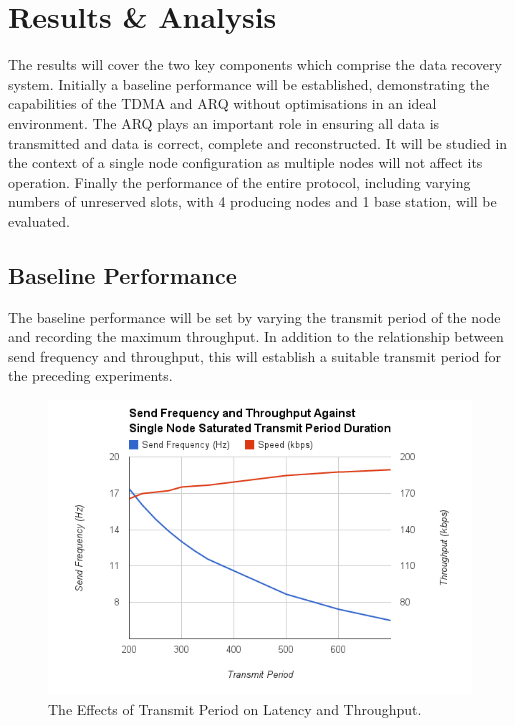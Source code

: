 \documentclass[parskip]{cs4rep}
\begin{document}
\section{Results \& Analysis}

The results will cover the two key components which comprise the data recovery system. Initially a baseline performance will be established, demonstrating the capabilities of the TDMA and ARQ without optimisations in an ideal environment. The ARQ plays an important role in ensuring all data is transmitted and data is correct, complete and reconstructed. It will be studied in the context of a single node configuration as multiple nodes will not affect its operation. Finally the performance of the entire protocol, including varying numbers of unreserved slots, with 4 producing nodes and 1 base station, will be evaluated.

\subsection{Baseline Performance}

The baseline performance will be set by varying the transmit period of the node and recording the maximum throughput. In addition to the relationship between send frequency and throughput, this will establish a suitable transmit period for the preceding experiments. 

\begin{figure}
	\centering
	\includegraphics[width=120mm]{sendfreqvsthroughput.png}
	\caption{The Effects of Transmit Period on Latency and Throughput.}
	\label{fig:SendFreqVsThroughput}
\end{figure}
\end{document}
